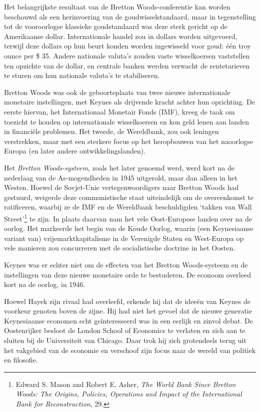 \documentclass[
  a5paper,
  smalldemyvopaper,11pt,twoside,onecolumn,openright,extrafontsizes,
hidelinks]{memoir}
\begin{document}
Het belangrijkste resultaat van de Bretton Woods-conferentie kan worden
beschouwd als een herinvoering van de goudwisselstandaard, maar in
tegenstelling tot de vooroorlogse klassieke goudstandaard was deze sterk
gericht op de Amerikaanse dollar. Internationale handel zou in dollars
worden uitgevoerd, terwijl deze dollars op hun beurt konden worden
ingewisseld voor goud: één troy ounce per \$ 35. Andere nationale
valuta's zouden vaste wisselkoersen vaststellen ten opzichte van de
dollar, en centrale banken werden verwacht de rentetarieven te sturen om
hun nationale valuta's te stabiliseren.

Bretton Woods was ook de geboorteplaats van twee nieuwe internationale
monetaire instellingen, met Keynes als drijvende kracht achter hun
oprichting. De eerste hiervan, het Internationaal Monetair Fonds (IMF),
kreeg de taak om toezicht te houden op internationale wisselkoersen en
kon geld lenen aan landen in financiële problemen. Het tweede, de
Wereldbank, zou ook leningen verstrekken, maar met een sterkere focus op
het heropbouwen van het naoorlogse Europa (en later andere
ontwikkelingslanden).

Het \emph{Bretton Woods-systeem}, zoals het later genoemd werd, werd
kort na de nederlaag van de As-mogendheden in 1945 uitgerold, maar dan
alleen in het Westen. Hoewel de Sovjet-Unie vertegenwoordigers naar
Bretton Woods had gestuurd, weigerde deze communistische staat
uiteindelijk om de overeenkomst te ratificeren, waarbij ze de IMF en de
Wereldbank beschuldigden `takken van Wall Street'\footnote{\hspace{0pt}Edward
  S. Mason and Robert E. Asher, \emph{The World Bank Since Bretton
  Woods: The Origins, Policies, Operations and Impact of the
  International Bank for Reconstruction}, 29.} te zijn. In plaats
daarvan nam het vele Oost-Europese landen over na de oorlog. Het
markeerde het begin van de Koude Oorlog, waarin (een Keynesiaanse
variant van) vrijemarktkapitalisme in de Verenigde Staten en West-Europa
op vele manieren zou concurreren met de socialistische doctrine in het
Oosten.

Keynes was er echter niet om de effecten van het Bretton Woods-systeem
en de instellingen van deze nieuwe monetaire orde te bestuderen. De
econoom overleed kort na de oorlog, in 1946.

Hoewel Hayek zijn rivaal had overleefd, erkende hij dat de ideeën van
Keynes de voorkeur genoten boven de zijne. Hij had niet het gevoel dat
de nieuwe generatie Keynesiaanse economen echt geïnteresseerd was in een
eerlijk en zinvol debat. De Oostenrijker besloot de London School of
Economics te verlaten en zich aan te sluiten bij de Universiteit van
Chicago. Daar trok hij zich grotendeels terug uit het vakgebied van de
economie en verschoof zijn focus naar de wereld van politiek en
filosofie.
\end{document}
